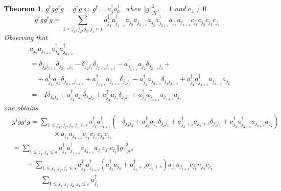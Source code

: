 \documentclass[aps,preprint]{revtex4}%
\newtheorem{theorem}{Theorem}
\begin{document}
\begin{theorem}
\bigskip$g^{\dagger}gg^{\dagger}g=g^{\dagger}g\Longleftrightarrow g^{\dagger
}=a_{j}^{\dagger}a_{k}^{\dagger},$ when $\left\Vert g\right\Vert
_{\mathcal{H}^{2}}^{2}=1$ and $c_{1}\neq0$%
\begin{equation}
g^{\dagger}gg^{\dagger}g=\sum_{1\leq j_{1},j_{2},j_{3},j_{4}\leq s}a_{j_{1}%
}^{\dagger}a_{j_{1+s}}^{\dagger}a_{j_{2}}a_{j_{2+s}}a_{j_{3}}^{\dagger
}a_{j_{3+s}}^{\dagger}a_{j_{4}}a_{j_{4+s}}c_{j_{1}}c_{j_{2}}c_{j_{3}}c_{j_{4}}%
\end{equation}
Observing that
\begin{align}
&  a_{j_{2}}a_{j_{2+s}}a_{j_{3}}^{\dagger}a_{j_{3+s}}^{\dagger}\nonumber\\
&  =\delta_{j_{2}j_{3+s}}\delta_{j_{2+s}j_{3}}-\delta_{j_{2}j_{3}}%
\delta_{j_{2+s}j_{3+s}}-a_{j_{3+s}}^{\dagger}a_{j_{2}}\delta_{j_{2+s}j_{3}%
}+\nonumber\\
&  \quad+a_{j_{3}}^{\dagger}a_{j_{2}}\delta_{j_{2+s}j_{3+s}}+a_{j_{3+s}%
}^{\dagger}a_{j_{2+s}}\delta_{j_{2}j_{3}}-a_{j_{3}}^{\dagger}a_{j_{2+s}}%
\delta_{j_{2}j_{3+s}}+a_{j_{3}}^{\dagger}a_{j_{3+s}}^{\dagger}a_{j_{2+s}%
}a_{j_{2}}\nonumber\\
&  =-I\delta_{j_{2}j_{3}}+a_{j_{3}}^{\dagger}a_{j_{2}}\delta_{j_{2}j_{3}%
}+a_{j_{3}}^{\dagger}a_{j_{2}}\delta_{j_{2}j_{3}}+a_{j_{3}}^{\dagger
}a_{j_{3+s}}^{\dagger}a_{j_{2+s}}a_{j_{2}}%
\end{align}
one obtains%
\begin{align}
&  g^{\dagger}gg^{\dagger}g=\sum_{1\leq j_{1},j_{2},j_{3},j_{4}\leq s}%
a_{j_{1}}^{\dagger}a_{j_{1+s}}^{\dagger}\left(  -\delta_{j_{2}j_{3}}+a_{j_{3}%
}^{\dagger}a_{j_{2}}\delta_{j_{2}j_{3}}+a_{j_{3}+s}^{\dagger}a_{j_{2}+s}%
\delta_{j_{2}j_{3}}+a_{j_{3}}^{\dagger}a_{j_{3+s}}^{\dagger}a_{j_{2+s}%
}a_{j_{2}}\right) \nonumber\\
&  \qquad\qquad\qquad\times a_{j_{4}}a_{j_{4+s}}c_{j_{1}}c_{j_{2}}c_{j_{3}%
}c_{j_{4}}\nonumber\\
&  =\sum_{1\leq j_{1},j_{4}\leq s}a_{j_{1}}^{\dagger}a_{j_{1+s}}^{\dagger
}a_{j_{4+s}}a_{j_{4}}c_{j_{1}}c_{j_{4}}\left\Vert g\right\Vert _{\mathcal{H}%
^{2}}^{2}\nonumber\\
&  \qquad+\sum_{1\leq j_{1},j_{2},j_{4}\leq s}a_{j_{1}}^{\dagger}a_{j_{1+s}%
}^{\dagger}\left(  a_{j_{2}}^{\dagger}a_{j_{2}}+a_{j_{2}+s}^{\dagger}%
a_{j_{2}+s}\right)  a_{j_{4}}a_{j_{4+s}}c_{j_{1}}n_{j_{2}}c_{j_{4}}\nonumber\\
&  \quad\qquad+\sum_{1\leq j_{1},j_{2},j_{3},j_{4}\leq s}a_{j_{1}}^{\dagger
}
\end{align}
\end{theorem}
\end{document}
